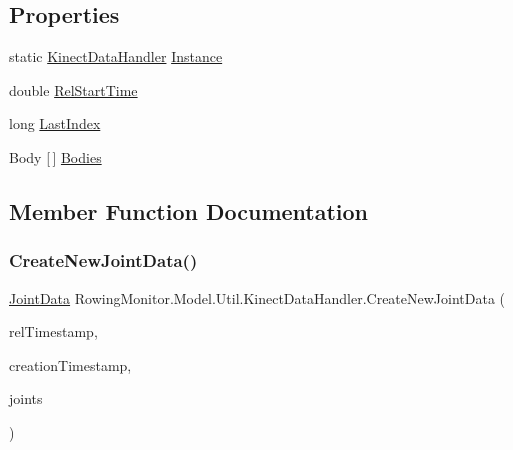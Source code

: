 \subsection*{Properties}
\begin{DoxyCompactItemize}
\item 
static \hyperlink{class_rowing_monitor_1_1_model_1_1_util_1_1_kinect_data_handler}{Kinect\+Data\+Handler} \hyperlink{class_rowing_monitor_1_1_model_1_1_util_1_1_kinect_data_handler_ad9209193c7b73ab88e4398bfa9c2d0b2}{Instance}
\item 
double \hyperlink{class_rowing_monitor_1_1_model_1_1_util_1_1_kinect_data_handler_aa21aa573d216387e67181b49bf4eb4f5}{Rel\+Start\+Time}
\item 
long \hyperlink{class_rowing_monitor_1_1_model_1_1_util_1_1_kinect_data_handler_abd75c2380b775c7d858e681249e3685c}{Last\+Index}
\item 
Body \mbox{[}$\,$\mbox{]} \hyperlink{class_rowing_monitor_1_1_model_1_1_util_1_1_kinect_data_handler_a099b9bc04fc8023717be35549aaeddda}{Bodies}
\end{DoxyCompactItemize}


\subsection{Member Function Documentation}
\mbox{\label{class_rowing_monitor_1_1_model_1_1_util_1_1_kinect_data_handler_aad695db8966d25a7c4226c369bc6be32}} 
\subsubsection{\texorpdfstring{Create\+New\+Joint\+Data()}{CreateNewJointData()}}
{\footnotesize\ttfamily \hyperlink{struct_rowing_monitor_1_1_model_1_1_util_1_1_joint_data}{Joint\+Data} Rowing\+Monitor.\+Model.\+Util.\+Kinect\+Data\+Handler.\+Create\+New\+Joint\+Data (\begin{DoxyParamCaption}\item[{double}]{rel\+Timestamp,  }\item[{double}]{creation\+Timestamp,  }\item[{I\+Read\+Only\+Dictionary$<$ Joint\+Type, Joint $>$}]{joints }\end{DoxyParamCaption})}


